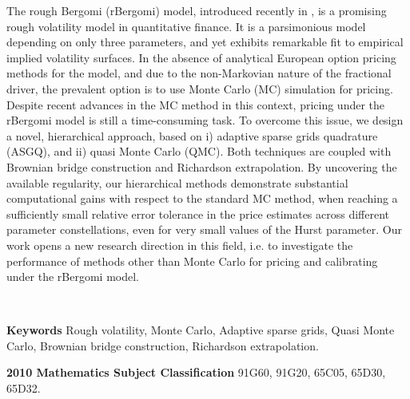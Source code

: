 The rough Bergomi (rBergomi) model, introduced recently in  \cite{bayer2016pricing}, is a promising rough volatility model in quantitative finance. It is a parsimonious model depending on only three parameters, and yet exhibits remarkable fit to empirical implied volatility surfaces. In the absence of analytical European option pricing methods for the model, and due to the non-Markovian nature of the fractional driver, the prevalent option is to use Monte Carlo (MC) simulation for pricing. Despite recent advances in the MC method in this context, pricing under the rBergomi model is still a time-consuming task. To overcome this issue, we design a novel,  hierarchical approach, based on i) adaptive sparse grids quadrature (ASGQ), and ii) quasi Monte Carlo (QMC). Both techniques are coupled with Brownian bridge construction and Richardson extrapolation. By uncovering the available regularity,  our hierarchical methods demonstrate substantial computational gains with respect to the standard MC method, when reaching a sufficiently small relative error tolerance in the price estimates across different parameter constellations, even for very small values of the Hurst  parameter. Our work opens a new research direction in this field, i.e. to investigate the performance of  methods  other than Monte Carlo for pricing and calibrating under the rBergomi model.

\

\textbf{Keywords} Rough volatility, Monte Carlo, Adaptive sparse grids, Quasi Monte Carlo, Brownian bridge construction, Richardson extrapolation.

\textbf{2010 Mathematics Subject Classification} 	91G60, 	91G20, 65C05, 65D30, 65D32.